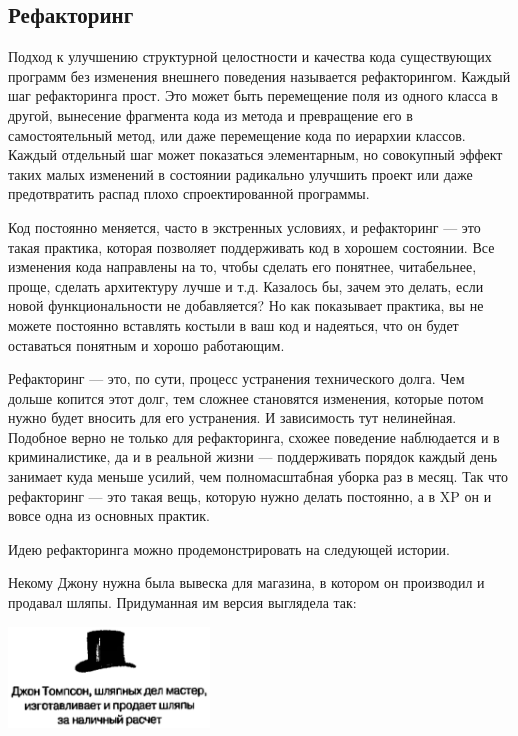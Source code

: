 \documentclass{../../text-style}
\begin{document}
\subsection{Рефакторинг}

Подход к улучшению структурной целостности и качества кода существующих программ без изменения внешнего поведения называется рефакторингом. Каждый шаг рефакторинга прост. Это может быть перемещение поля из одного класса в другой, вынесение фрагмента кода из метода и превращение его в самостоятельный метод, или даже перемещение кода по иерархии классов. Каждый отдельный шаг может показаться элементарным, но совокупный эффект таких малых изменений в состоянии радикально улучшить проект или даже предотвратить распад плохо спроектированной программы. 

Код постоянно меняется, часто в экстренных условиях, и рефакторинг --- это такая практика, которая позволяет поддерживать код в хорошем состоянии. Все изменения кода направлены на то, чтобы сделать его понятнее, читабельнее, проще, сделать архитектуру лучше и т.д. Казалось бы, зачем это делать, если новой функциональности не добавляется? Но как показывает практика, вы не можете постоянно вставлять костыли в ваш код и надеяться, что он будет оставаться понятным и хорошо работающим.

Рефакторинг --- это, по сути, процесс устранения технического долга. Чем дольше копится этот долг, тем сложнее становятся изменения, которые потом нужно будет вносить для его устранения. И зависимость тут нелинейная. Подобное верно не только для рефакторинга, схожее поведение наблюдается и в криминалистике, да и в реальной жизни --- поддерживать порядок каждый день занимает куда меньше усилий, чем полномасштабная уборка раз в месяц. Так что рефакторинг --- это такая вещь, которую нужно делать постоянно, а в XP он и вовсе одна из основных практик.

Идею рефакторинга можно продемонстрировать на следующей истории.

Некому Джону нужна была вывеска для магазина, в котором он производил и продавал шляпы. Придуманная им версия выглядела так:

\begin{center}
    \includegraphics[width=0.4\textwidth]{hatsRefactoringInitial.png}
\end{center}
\end{document}
